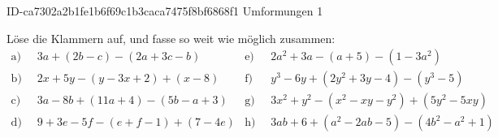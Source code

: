 \begin{exercise}
      {ID-ca7302a2b1fe1b6f69c1b3caca7475f8bf6868f1}
      {Umformungen 1}
  \newcommand{\gap}{\;\;}%
  \ifproblem\problem\par
    Löse die Klammern auf, und fasse so weit wie möglich zusammen:
    \begin{align*}
      \text{a)}\gap & 3a+(2b-c)-(2a+3c-b) &
      \text{e)}\gap & 2a^2+3a-(a+5)-(1-3a^2)
      \\
      \text{b)}\gap & 2x+5y-(y-3x+2)+(x-8) &
      \text{f)}\gap & y^3-6y+(2y^2+3y-4)-(y^3-5)
      \\
      \text{c)}\gap & 3a-8b+(11a+4)-(5b-a+3) &
      \text{g)}\gap & 3x^2+y^2-(x^2-xy-y^2)+(5y^2-5xy)
      \\
      \text{d)}\gap & 9+3e-5f-(e+f-1)+(7-4e) &
      \text{h)}\gap & 3ab+6+(a^2-2ab-5)-(4b^2-a^2+1)
    \end{align*}
  \fi
  \ifoutcome\outcome\par
    \newcommand{\toprow}[1]
    {%
      \makebox[20em][l]
      {%
        \ensuremath
        {%
          \displaystyle
          \phantom{\,=\:\,}%
          #1%
        }%
      }%
    }%
    \newcommand{\solutionA}
    {%
      \begin{equation*}
        \begin{split}
          \text{a)} &\toprow{3a+(2b-c)-(2a+3c-b)} \\
                    &=       3a+2b-c-2a-3c+b      \\
                    &=       a+3b-4c
        \end{split}
      \end{equation*}
    }%
    \newcommand{\solutionB}
    {%
      \begin{equation*}
        \begin{split}
          \text{b)} &\toprow{2x+5y-(y-3x+2)+(x-8)} \\
                    &=       2x+5y-y+3x-2+x-8      \\
                    &=       6x+4y-10
        \end{split}
      \end{equation*}
    }%
    \newcommand{\solutionC}
    {%
      \begin{equation*}
        \begin{split}
          \text{c)} &\toprow{3a-8b+(11a+4)-(5b-a+3)} \\

\end{split}
\end{equation*}}
\end{exercise}
